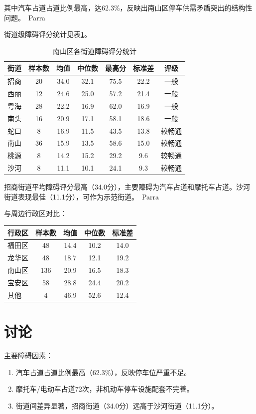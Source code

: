 \documentclass{article}
\begin{document}
其中汽车占道占道比例最高，达62.3\%，反映出南山区停车供需矛盾突出的结构性问题。\ Parra

街道级障碍评分统计见表\ref{tab:street}。
\begin{table}[h]
\centering
\caption{南山区各街道障碍评分统计}\label{tab:street}
\begin{tabular}{lcccccc}
\toprule
街道 & 样本数 & 均值 & 中位数 & 最高分 & 标准差 & 评级 \\ \midrule
招商 & 20 & 34.0 & 32.1 & 75.5 & 22.2 & 一般 \\
西丽 & 12 & 24.6 & 25.0 & 57.2 & 21.4 & 一般 \\
粤海 & 28 & 22.2 & 16.9 & 62.0 & 16.9 & 一般 \\
南头 & 16 & 20.9 & 17.1 & 58.1 & 18.6 & 一般 \\
蛇口 & 8 & 16.9 & 11.5 & 43.5 & 13.8 & 较畅通 \\
南山 & 36 & 15.9 & 13.5 & 58.6 & 15.0 & 较畅通 \\
桃源 & 8 & 14.2 & 15.2 & 29.2 & 9.6 & 较畅通 \\
沙河 & 8 & 11.1 & 10.1 & 24.1 & 9.3 & 较畅通 \\
\bottomrule
\end{tabular}
\end{table}

招商街道平均障碍评分最高（34.0分），主要障碍为汽车占道和摩托车占道。沙河街道表现最佳（11.1分），可作为示范街道。\ Parra

与周边行政区对比：
\begin{tabular}{lcccc}
\toprule
行政区 & 样本数 & 均值 & 中位数 & 标准差 \\ \midrule
福田区 & 48 & 14.4 & 10.2 & 14.0 \\
龙华区 & 48 & 18.7 & 12.1 & 19.2 \\
南山区 & 136 & 20.9 & 16.5 & 18.3 \\
宝安区 & 58 & 28.8 & 24.4 & 20.2 \\
其他 & 4 & 46.9 & 52.6 & 12.4 \\
\bottomrule
\end{tabular}

\section{讨论}

主要障碍因素：
\begin{enumerate}
\item 汽车占道占道比例最高（62.3\%），反映停车位严重不足。
\item 摩托车/电动车占道72次，非机动车停车设施配套不完善。
\item 街道间差异显著，招商街道（34.0分）远高于沙河街道（11.1分）。
\end{enumerate}
\end{document}
